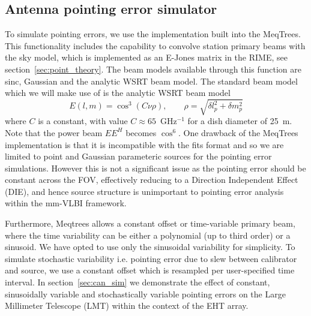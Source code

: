 \subsection{Antenna pointing error simulator}\label{sec:point_imp}

To simulate pointing errors, we use the implementation built into the {\sc MeqTrees}. This functionality includes the capability to convolve station primary beams with the sky model, which is implemented as an E-Jones matrix in the RIME, see section~\ref{sec:point_theory}. The beam models available through this function are sinc, Gaussian and the analytic WSRT beam model. The standard beam model which we will make use of is the analytic WSRT beam model \citep{Popping_2008} 
\begin{equation}\label{eq:wsrt_beam}
E(l, m) = \cos^3(C\nu \rho),\qquad   \rho = \sqrt{\delta l_p^2 + \delta m_p^2}
\end{equation}
where $C$ is a constant, with value $C \approx 65$~GHz$^{-1}$ for a dish diameter of 25~m. Note that the power beam $EE^H$ becomes $\cos^6$.  One drawback of the {\sc MeqTrees} implementation is that it is incompatible with the {\sc fits} format and so we are limited to point and Gaussian parameteric sources for the pointing error simulations. However this is not a significant issue as the pointing error should be constant across the FOV, effectively reducing to a Direction Independent Effect (DIE), and hence source structure is unimportant to pointing error analysis within the mm-VLBI framework.


Furthermore, {\sc Meqtrees} allows a constant offset or time-variable primary beam, where the time variability can be either a polynomial (up to third order) or a sinusoid. We have opted to use only the sinusoidal variability for simplicity. To simulate stochastic variability i.e. pointing error due to slew between calibrator and source, we use a constant offset which is resampled per user-specified time interval. In section~\ref{sec:can_sim} we demonstrate the effect of constant, sinusoidally variable and stochastically variable pointing errors on the Large Millimeter Telescope (LMT) within the context of the EHT array.

